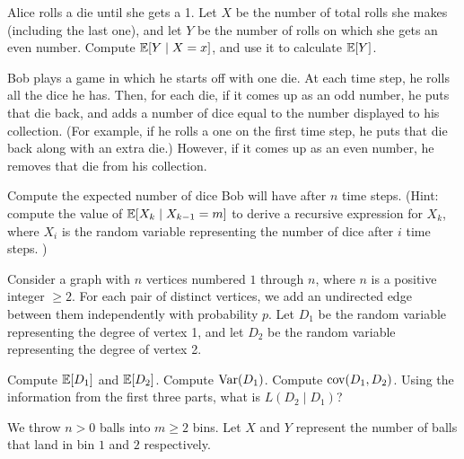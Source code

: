 \documentclass[11pt]{article}
\begin{document}
\begin{Parts}

\Part Alice rolls a die until she gets a 1. Let $X$ be the number of total rolls she makes (including the last one), and let $Y$ be the number of rolls on which she gets an even number. Compute $\operatorname{\mathbb{E}}[Y \mid X = x]$, and use it to calculate $\operatorname{\mathbb{E}}[Y]$. 

\Part Bob plays a game in which he starts off with one die. At each time step, he rolls all the dice he has. Then, for each die, if it comes up as an odd number, he puts that die back, and adds a number of dice equal to the number displayed to his collection. (For example, if he rolls a one on the first time step, he puts that die back along with an extra die.) However, if it comes up as an even number, he removes that die from his collection.

Compute the expected number of dice Bob will have after $n$ time steps. (Hint: compute the value of $\operatorname{\mathbb{E}}[X_k \mid X_{k-1} = m]$ to derive a recursive expression for $X_k$, where $X_i$ is the random variable representing the number of dice after $i$ time steps. )
\end{Parts}

Consider a graph with $n$ vertices numbered $1$ through $n$, where $n$ is a positive integer $\ge 2$. For each pair of distinct vertices, we add an undirected edge between them independently with probability $p$. Let $D_1$ be the random variable representing the degree of vertex 1, and let $D_2$ be the random variable representing the degree of vertex 2. 

\begin{Parts}
	\Part Compute $\operatorname{\mathbb{E}}[D_1]$ and $\operatorname{\mathbb{E}}[D_2]$.
	\Part Compute $\operatorname{Var}(D_1)$. 
	\Part Compute $\operatorname{cov}(D_1, D_2)$.
    \Part Using the information from the first three parts, what is $L(D_2 \mid D_1)$?
\end{Parts}

We throw $n > 0$ balls into $m \geq 2$ bins. Let $X$ and $Y$ represent the number of balls that land in bin $1$ and $2$ respectively.
\end{document}
